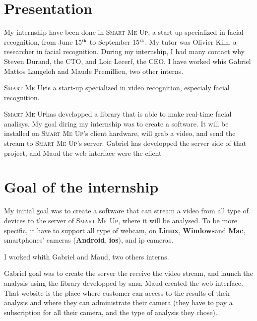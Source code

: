 \documentclass[a4paper,11pt]{custom}
\newcommand{\smu}{\textsc{Smart Me Up}}
\newcommand{\linux}{\textbf{Linux}}
\newcommand{\win}{\textbf{Windows}}
\newcommand{\mac}{\textbf{Mac}}
\newcommand{\android}{\textbf{Android}}
\newcommand{\ios}{\textbf{ios}}
\newcommand{\nth}[1]{#1$^{\text{\tiny th}}$}
\begin{document}
\chapter{Presentation}

My internship have been done in \smu, a start-up specialized in facial
recognition, from June \nth{15} to September \nth{15}. My tutor was Olivier
Kilh, a researcher in facial recognition. During my internship, I had many
contact why Steven Durand, the CTO, and Loic Lecerf, the CEO. I have worked whis
Gabriel Mattos Langeloh and Maude Premillieu, two other interns.

\smu is a start-up specialized in video recognition, especialy facial
recognition.

\smu has developped a library that is able to make real-time facial analisys. My
goal diring my internship was to create a software. It will be installed on
\smu's client hardware, will grab a video, and send the stream to \smu's server.
Gabriel has developped the server side of that project, and Maud the web
interface were the client 


\chapter{Goal of the internship}

My initial goal was to create a software that can stream a video from all type of
devices to the server of \smu, where it will be analysed. To be more specific,
it have to support all type of webcam, on \linux, \win and \mac, smartphones'
cameras (\android, \ios), and ip cameras.

I worked whith Gabriel and Maud, two others interns.

Gabriel goal was to create the server the receive the video stream, and launch
the analysis using the library developped by smu.
Maud created the web interface. That website is the place where customer can
access to the results of their analysis and where they can administrate their
camera (they have to pay a subscription for all their camera, and the type of
analysis they chose).
\end{document}
